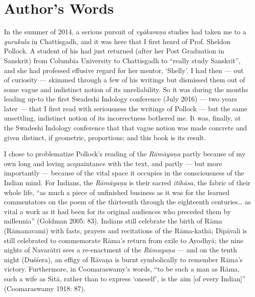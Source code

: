 \makeatletter
\def\@makeschapterhead#1{%
  \vspace*{50\p@}%
  {\parindent \z@ \raggedright
    \normalfont
    \interlinepenalty\@M
    \LARGE \bfseries  #1\par\nobreak
    \vskip 40\p@
  }}
\makeatother

\chapter*{Author's Words}\label{authors-words}


In the summer of 2014, a serious pursuit of {\sl vyākaraṇa} studies had taken me to a {\sl gurukula} in Chattisgadh, and it was here that I first heard of Prof. Sheldon Pollock. A student of his had just returned (after her Post Graduation in Sanskrit) from Columbia University to Chattisgadh to “really study Sanskrit”, and she had professed effusive regard for her mentor, ‘Shelly’. I had then --- out of curiosity --- skimmed through a few of his writings but dismissed them out of some vague and indistinct notion of its unreliability. So it was during the months leading up-to the first Swadeshi Indology conference (July 2016) --- two years later --- that I first read with seriousness the writings of Pollock --- but the same unsettling, indistinct notion of its incorrectness bothered me. It was, finally, at the Swadeshi Indology conference that that vague notion was made concrete and given distinct, if geometric, proportions; and this book is its result.  

I chose to problematize Pollock’s reading of the {\sl Rāmāyaṇa} partly because of my own long and loving acquaintance with the text, and partly --- but more importantly --- because of the vital space it occupies in the consciousness of the Indian mind. For Indians, the {\sl Rāmāyaṇa} is their sacred {\sl itihāsa}, the fabric of their whole life, “as much a piece of unfinished business as it was for the learned commentators on the poem of the thirteenth through the eighteenth centuries… as vital a work as it had been for its original audiences who preceded them by millennia” (Goldman 2005: 83). Indians still celebrate the birth of Rāma (Rāmanavami) with fasts, prayers and recitations of the Rāma-kathā; Dīpāvali is still celebrated to commemorate Rāma’s return from exile to Ayodhyā; the nine nights of Navarātri sees a re-enactment of the {\sl Rāmayaṇa} --- and on the tenth night (Duśśera), an effigy of Rāvaṇa is burnt symbolically to remember Rāma’s victory. Furthermore, in Coomaraswamy’s words, “to be such a man as Rāma, such a wife as Sītā, rather than to express ‘oneself’, is the aim [of every Indian]” (Coomaraswamy 1918: 87).

